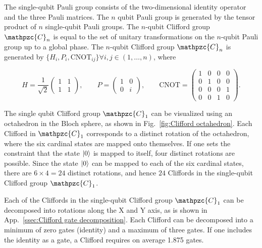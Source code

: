       The single-qubit Pauli group consists of the two-dimensional identity operator and the three Pauli matrices. The $n$ qubit Pauli group is generated by the tensor product of $n$ single-qubit Pauli groups. The $n$-qubit Clifford group $\mathpzc{C}_n$ is equal to the set of unitary transformations on the $n$-qubit Pauli group up to a global phase. The $n$-qubit Clifford group $\mathpzc{C}_n$ is generated by $\{H_i, P_i, \text{CNOT}_{ij}\} \forall i, j \in (1, \dots, n)$, where

      \begin{equation}
        H =
        \frac{1}{\sqrt{2}}
        \begin{pmatrix}
          1 & 1 \\
          1 & 1
        \end{pmatrix}, \qquad
        P =
        \begin{pmatrix}
          1 & 0 \\
          0 & i
        \end{pmatrix}, \qquad
        \text{CNOT} =
        \begin{pmatrix}
          1 & 0 & 0 & 0 \\
          0 & 1 & 0 & 0 \\
          0 & 0 & 0 & 1 \\
          0 & 0 & 1 & 0
        \end{pmatrix}.
      \end{equation}

      The single qubit Clifford group $\mathpzc{C}_1$ can be visualized using an octahedron in the Bloch sphere, as shown in Fig.~\ref{fig:Clifford octahedron}. Each Clifford in $\mathpzc{C}_1$ corresponds to a distinct rotation of the octahedron, where the six cardinal states are mapped onto themselves. If one sets the constraint that the state $\ket{0}$ is mapped to itself, four distinct rotations are possible. Since the state $\ket{0}$ can be mapped to each of the six cardinal states, there are $6 \times 4=24$ distinct rotations, and hence $24$ Cliffords in the single-qubit Clifford group $\mathpzc{C}_1$.

      Each of the Cliffords in the single-qubit Clifford group $\mathpzc{C}_1$ can be decomposed into rotations along the X and Y axis, as is shown in App.~\ref{ssec:Clifford gate decomposition}. Each Clifford can be decomposed into a minimum of zero gates (identity) and a maximum of three gates. If one includes the identity as a gate, a Clifford requires on average 1.875 gates.

